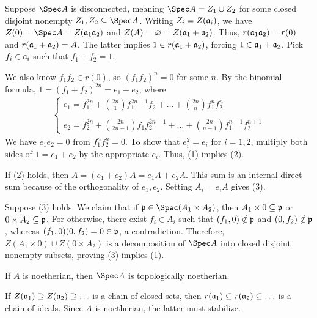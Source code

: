 \documentclass[10pt,final,oneside]{amsbook}
\makeatletter
\renewenvironment{proof}[1][\proofname] 
{ 	
	\par\pushQED{\qed}\normalfont\topsep6\p@\@plus6\p@\relax\trivlist\itemindent\normalparindent
	\item[\hskip\labelsep\itshape#1\@addpunct{.}]\ignorespaces
}
{
	\popQED\endtrivlist\@endpefalse
}
\numberwithin{equation}{section}
\makeatother
\begin{document}
\begin{proof}
Suppose $\Spec A$ is disconnected, meaning $\Spec A = Z_1 \cup Z_2$ for some closed disjoint nonempty $Z_1, Z_2 \subeq \Spec A$.
Writing $Z_i = Z(\mathfrak{a}_i)$, we have $Z(0) = \Spec A = Z(\fr{a}_1 \fr{a}_2)$ and $Z(A) = \varnothing = Z(\mathfrak{a}_1 + \mathfrak{a}_2)$.
Thus, $r(\mathfrak{a}_1\mathfrak{a}_2) = r(0)$ and $r(\mathfrak{a}_1 + \mathfrak{a}_2) = A$.
The latter implies $1 \in r(\mathfrak{a}_1 + \mathfrak{a}_2)$, forcing $1 \in \mathfrak{a}_1 + \mathfrak{a}_2$.
Pick $f_i \in \mathfrak{a}_i$ such that $f_1 + f_2 = 1$.

We also know $f_1f_2 \in r(0)$, so $(f_1f_2)^n = 0$ for some $n$.
By the binomial formula, $1 = (f_1 + f_2)^{2n} = e_1 + e_2$, where
\begin{align}
\left\{\begin{array}{ll}
e_1		= 	f_1^{2n} + \binom{2n}{1} f_1^{2n - 1}f_2 + \ldots + \binom{2n}{n} f_1^n f_2^n
					\\
					\\
e_2		=	f_2^{2n} + \binom{2n}{2n - 1}f_1f_2^{2n - 1} + \ldots + \binom{2n}{n + 1}f_1^{n - 1}f_2^{n + 1}
\end{array}\right.
\end{align}
We have $e_1e_2 = 0$ from $f_1^nf_2^n = 0$.
To show that $e_i^2 = e_i$ for $i = 1,2$, multiply both sides of $1 = e_1 + e_2$ by the appropriate $e_i$.
Thus, (1) implies (2).

If (2) holds, then $A = (e_1 + e_2)A = e_1A + e_2A$.
This sum is an internal direct sum because of the orthogonality of $e_1, e_2$.
Setting $A_i = e_iA$ gives (3).

Suppose (3) holds.
We claim that if $\fr{p} \in \Spec (A_1 \times A_2)$, then $A_1 \times 0 \subseteq \mathfrak{p}$ or $0 \times A_2 \subseteq \mathfrak{p}$.
For otherwise, there exist $f_i \in A_i$ such that $(f_1, 0) \notin \mathfrak{p}$ and $(0, f_2) \notin \mathfrak{p}$, whereas $(f_1, 0)(0, f_2) = 0 \in \mathfrak{p}$, a contradiction.
Therefore, $Z(A_1 \times 0) \cup Z(0 \times A_2)$ is a decomposition of $\Spec A$ into closed disjoint nonempty subsets, proving (3) implies (1).
\end{proof}

\begin{prop}\label{Noetherian}
If $A$ is noetherian, then $\Spec A$ is topologically noetherian.
\end{prop}

\begin{proof}
If $Z(\mathfrak{a}_1) \supseteq Z(\mathfrak{a}_2) \supseteq \ldots$ is a chain of closed sets, then $r(\mathfrak{a}_1) \subseteq r(\mathfrak{a}_2) \subseteq \ldots$ is a chain of ideals.
Since $A$ is noetherian, the latter must stabilize.
\end{proof}
\end{document}

